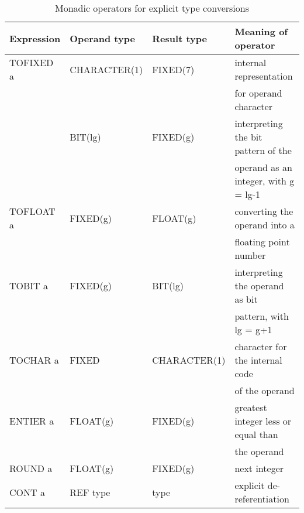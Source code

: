\begin{table} %
\begin{center}
\caption{Monadic operators for explicit type conversions}
\label{tab_monadic_type}
\vspace{5mm}
\begin{tabular}{|l|l|l|l|}
\hline
{\bf Expression} & {\bf Operand type} & {\bf Result type} & {\bf Meaning of operator}\\ \hline

TOFIXED a
\index{TOFIXED@\textbf{TOFIXED}|textbf}
        & CHARACTER(1)      & FIXED(7)         & internal representation\\
                &                   &                   & for operand character\\ \cline{2-4}
                     
                 & BIT(lg)           & FIXED(g)         & interpreting the bit pattern of the\\
                 &                   &                  & operand as an integer, with g = lg-1\\ \hline

TOFLOAT a
\index{TOFLOAT@\textbf{TOFLOAT}|textbf}
        & FIXED(g)          & FLOAT(g)         & converting the operand into a\\
                 &                   &                  & floating point number\\ \hline
    
TOBIT a
\index{TOBIT@\textbf{TOBIT}|textbf}
          & FIXED(g)          & BIT(lg)          & interpreting the operand as bit\\
                 &                   &                  & pattern, with lg = g+1\\ \hline

TOCHAR a
\index{TOCHAR@\textbf{TOCHAR}|textbf}
         & FIXED             & CHARACTER(1)     & character for the internal code\\
                 &                   &                  & of the operand\\ \hline

ENTIER a
\index{ENTIER@\textbf{ENTIER}|textbf}
         & FLOAT(g)          & FIXED(g)         & greatest integer less or equal than\\
                 &                   &                  & the operand\\ \hline
 
ROUND a
\index{ROUND@\textbf{ROUND}|textbf}
          & FLOAT(g)          & FIXED(g)         & next integer \\ \hline

CONT a
\index{CONT@\textbf{CONT}|textbf}
           & REF type          & type             & explicit de-referentiation\\
\hline
\end{tabular}  
\end{center} 
\end{table}

